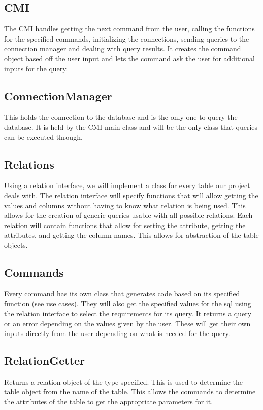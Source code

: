 \documentclass{article}
\begin{document}
		\subsection{CMI}
			The CMI handles getting the next command from the user, calling the functions for the specified commands,
			initializing the connections, sending queries to the connection manager and dealing with query results.
			It creates the command object based off the user input and lets the command ask the user for additional
			inputs for the query.
			
		\subsection{ConnectionManager}
			This holds the connection to the database and is the only one to query the database. It is held by the CMI
			main class and will be the only class that queries can be executed through.
			
		\subsection{Relations}
			Using a relation interface, we will implement a class for every table our project deals with. The relation
			interface will specify functions that will allow getting the values and columns without having to know what
			relation is being used. This allows for the creation of generic queries usable with all possible relations.
			Each relation will contain functions that allow for setting the attribute, getting the attributes, and
			getting the column names. This allows for abstraction of the table objects.
			
		\subsection{Commands}
			Every command has its own class that generates code based on its specified function (see use cases). 
			They will also get the specified values for the sql using the relation interface to select the requirements
			for its query. It returns a query or an error depending on the values given by the user. These will get
			their own inputs directly from the user depending on what is needed for the query.

		\subsection{RelationGetter}
			Returns a relation object of the type specified. This is used to determine the table object from the name
			of the table. This allows the commands to determine the attributes of the table to get the appropriate
			parameters for it.
\end{document}
